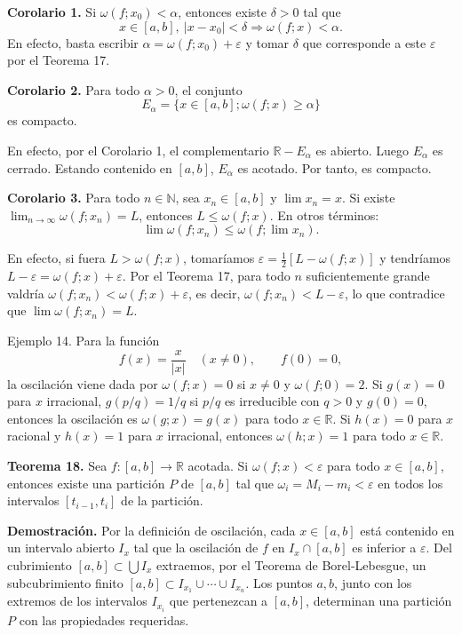 \documentclass[12pt,oneside]{book}
\begin{document}
\textbf{Corolario 1.} Si \(\omega(f; x_0) < \alpha\), entonces existe \(\delta > 0\) tal que
\[
x \in [a, b],\ |x - x_0| < \delta \Rightarrow \omega(f; x) < \alpha.
\]
En efecto, basta escribir \(\alpha = \omega(f; x_0) + \varepsilon\) y tomar \(\delta\) que corresponde a este \(\varepsilon\) por el Teorema 17.

\textbf{Corolario 2.} Para todo \(\alpha > 0\), el conjunto
\[
E_\alpha = \{x \in [a, b]; \omega(f; x) \geq \alpha\}
\]
es compacto.

En efecto, por el Corolario 1, el complementario \(\mathbb{R} - E_\alpha\) es abierto. Luego \(E_\alpha\) es cerrado. Estando contenido en \([a, b]\), \(E_\alpha\) es acotado. Por tanto, es compacto.

\textbf{Corolario 3.} Para todo \(n \in \mathbb{N}\), sea \(x_n \in [a, b]\) y \(\lim x_n = x\). Si existe \(\lim_{n \to \infty} \omega(f; x_n) = L\), entonces \(L \leq \omega(f; x)\). En otros términos:
\[
\lim \omega(f; x_n) \leq \omega(f; \lim x_n).
\]

En efecto, si fuera \(L > \omega(f; x)\), tomaríamos \(\varepsilon = \frac{1}{2}[L - \omega(f; x)]\) y tendríamos \(L - \varepsilon = \omega(f; x) + \varepsilon\). Por el Teorema 17, para todo \(n\) suficientemente grande valdría \(\omega(f; x_n) < \omega(f; x) + \varepsilon\), es decir, \(\omega(f; x_n) < L - \varepsilon\), lo que contradice que \(\lim \omega(f; x_n) = L\).

Ejemplo 14. Para la función
\[
f(x) = \frac{x}{|x|} \quad (x \neq 0), \qquad f(0) = 0,
\]
la oscilación viene dada por \(\omega(f; x) = 0\) si \(x \neq 0\) y \(\omega(f; 0) = 2\). Si \(g(x) = 0\) para \(x\) irracional, \(g(p/q) = 1/q\) si \(p/q\) es irreducible con \(q > 0\) y \(g(0) = 0\), entonces la oscilación es \(\omega(g;x) = g(x)\) para todo \(x \in \mathbb{R}\). Si \(h(x) = 0\) para \(x\) racional y \(h(x) = 1\) para \(x\) irracional, entonces \(\omega(h;x) = 1\) para todo \(x \in \mathbb{R}\).

\textbf{Teorema 18.} Sea \(f: [a, b] \to \mathbb{R}\) acotada. Si \(\omega(f;x) < \varepsilon\) para todo \(x \in [a, b]\), entonces existe una partición \(P\) de \([a, b]\) tal que \(\omega_i = M_i - m_i < \varepsilon\) en todos los intervalos \([t_{i-1}, t_i]\) de la partición.

\textbf{Demostración.} Por la definición de oscilación, cada \(x \in [a, b]\) está contenido en un intervalo abierto \(I_x\) tal que la oscilación de \(f\) en \(I_x \cap [a, b]\) es inferior a \(\varepsilon\). Del cubrimiento \([a, b] \subset \bigcup I_x\) extraemos, por el Teorema de Borel-Lebesgue, un subcubrimiento finito \([a, b] \subset I_{x_1} \cup \cdots \cup I_{x_n}\). Los puntos \(a, b\), junto con los extremos de los intervalos \(I_{x_i}\) que pertenezcan a \([a, b]\), determinan una partición \(P\) con las propiedades requeridas.
\end{document}
